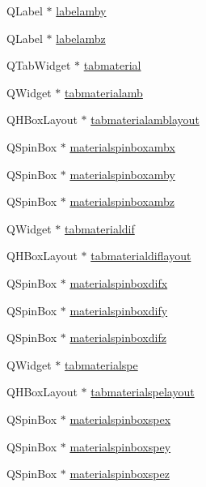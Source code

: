 \begin{DoxyCompactItemize}
Q\+Label $\ast$ \hyperlink{class_mondock_a467e81ae77fc44ddd9785214c64ae443}{labelamby}
\item 
Q\+Label $\ast$ \hyperlink{class_mondock_a59965e3362191562ca427aaafbffb67f}{labelambz}
\item 
Q\+Tab\+Widget $\ast$ \hyperlink{class_mondock_a85429c5714bc04dc5866983a9659f723}{tabmaterial}
\item 
Q\+Widget $\ast$ \hyperlink{class_mondock_a5b0d6245de8e0e70d7552ad035295793}{tabmaterialamb}
\item 
Q\+H\+Box\+Layout $\ast$ \hyperlink{class_mondock_a768206ca1e41a57f687e6bbbdaca3a9a}{tabmaterialamblayout}
\item 
Q\+Spin\+Box $\ast$ \hyperlink{class_mondock_a4efb6643d3bea5ac601770ed2e3b3290}{materialspinboxambx}
\item 
Q\+Spin\+Box $\ast$ \hyperlink{class_mondock_a52f12188582ccf1488a2f5f2059ec304}{materialspinboxamby}
\item 
Q\+Spin\+Box $\ast$ \hyperlink{class_mondock_a24725d21ed105e3d2fc2c2360c2581a6}{materialspinboxambz}
\item 
Q\+Widget $\ast$ \hyperlink{class_mondock_a1d05427fb146c04086803be70153d868}{tabmaterialdif}
\item 
Q\+H\+Box\+Layout $\ast$ \hyperlink{class_mondock_a346764281a416f9221d71a96cf9ce4fc}{tabmaterialdiflayout}
\item 
Q\+Spin\+Box $\ast$ \hyperlink{class_mondock_abf580ff2de20747ff28cb3af69aec147}{materialspinboxdifx}
\item 
Q\+Spin\+Box $\ast$ \hyperlink{class_mondock_ab1c4bb9e29202b1fcb3d4f2f2f7112a8}{materialspinboxdify}
\item 
Q\+Spin\+Box $\ast$ \hyperlink{class_mondock_abaa05027f2871448e35b82516e0559b8}{materialspinboxdifz}
\item 
Q\+Widget $\ast$ \hyperlink{class_mondock_a7f99e6c98995aa1e236e44be190e0fa6}{tabmaterialspe}
\item 
Q\+H\+Box\+Layout $\ast$ \hyperlink{class_mondock_a705948bf976e373b5afb90c9f0641580}{tabmaterialspelayout}
\item 
Q\+Spin\+Box $\ast$ \hyperlink{class_mondock_a964af1b06eda72c95695ff25146892ec}{materialspinboxspex}
\item 
Q\+Spin\+Box $\ast$ \hyperlink{class_mondock_a38fad0c6901791690bdedba633bc3220}{materialspinboxspey}
\item 
Q\+Spin\+Box $\ast$ \hyperlink{class_mondock_ab5e93ab98c43f314fa48b84be8098beb}{materialspinboxspez}
\item 

\end{DoxyCompactItemize}
